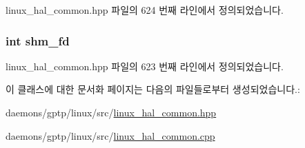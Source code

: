 linux\+\_\+hal\+\_\+common.\+hpp 파일의 624 번째 라인에서 정의되었습니다.

\subsubsection[{\texorpdfstring{shm\+\_\+fd}{shm_fd}}]{\setlength{\rightskip}{0pt plus 5cm}int shm\+\_\+fd\hspace{0.3cm}{\ttfamily [private]}}\hypertarget{class_linux_shared_memory_i_p_c_a67ca3e78936424920539c340223a0b0a}{}\label{class_linux_shared_memory_i_p_c_a67ca3e78936424920539c340223a0b0a}


linux\+\_\+hal\+\_\+common.\+hpp 파일의 623 번째 라인에서 정의되었습니다.



이 클래스에 대한 문서화 페이지는 다음의 파일들로부터 생성되었습니다.\+:\begin{DoxyCompactItemize}
\item 
daemons/gptp/linux/src/\hyperlink{linux__hal__common_8hpp}{linux\+\_\+hal\+\_\+common.\+hpp}\item 
daemons/gptp/linux/src/\hyperlink{linux__hal__common_8cpp}{linux\+\_\+hal\+\_\+common.\+cpp}\end{DoxyCompactItemize}
